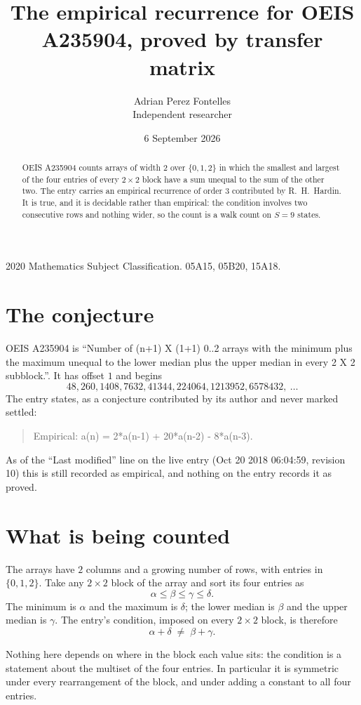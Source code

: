 \documentclass[11pt,a4paper]{article}
\title{The empirical recurrence for OEIS A235904, proved by transfer matrix}
\author{Adrian Perez Fontelles\\ \small Independent researcher}
\date{6 September 2026}
\theoremstyle{plain}
\theoremstyle{definition}
\begin{document}
\maketitle

\begin{abstract}
OEIS A235904 counts arrays of width $2$ over $\{0,1,2\}$ in which the smallest and largest of the
four entries of every $2\times2$ block have a sum unequal to the sum of the other two. The entry
carries an empirical recurrence of order $3$ contributed by R.~H.~Hardin. It is true, and
it is decidable rather than empirical: the condition involves two consecutive rows and nothing
wider, so the count is a walk count on $S=9$ states.
\end{abstract}

\noindent\small 2020 Mathematics Subject Classification. 05A15, 05B20, 15A18.\normalsize

\section{The conjecture}

OEIS A235904 is ``Number of (n+1) X (1+1) 0..2 arrays with the minimum plus the maximum unequal to the lower median plus the upper median in every 2 X 2 subblock.''. It has offset $1$ and begins
\[
48, 260, 1408, 7632, 41344, 224064, 1213952, 6578432,\ \dots
\]
The entry states, as a conjecture contributed by its author and never marked settled:
\begin{quote}
Empirical: a(n) = 2*a(n-1) + 20*a(n-2) - 8*a(n-3).
\end{quote}
As of the ``Last modified'' line on the live entry (Oct 20 2018 06:04:59, revision 10) this is still
recorded as empirical, and nothing on the entry records it as proved.

\section{What is being counted}

The arrays have $2$ columns and a growing number of rows, with entries in $\{0,1,2\}$. Take any
$2\times2$ block of the array and sort its four entries as
\[
\alpha\le\beta\le\gamma\le\delta .
\]
The minimum is $\alpha$ and the maximum is $\delta$; the lower median is $\beta$ and the upper
median is $\gamma$. The entry's condition, imposed on every $2\times2$ block, is therefore
\[
\alpha+\delta\;\neq\;\beta+\gamma .
\]

Nothing here depends on where in the block each value sits: the condition is a statement about
the multiset of the four entries. In particular it is symmetric under every rearrangement of
the block, and under adding a constant to all four entries.
\end{document}
